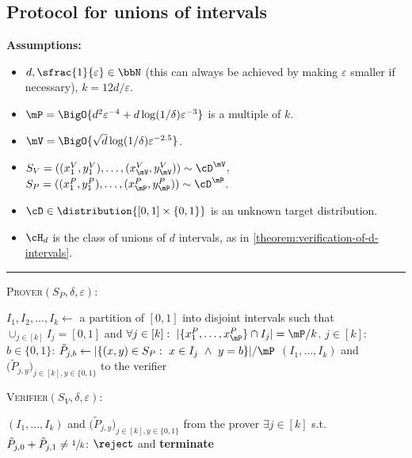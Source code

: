 \documentclass[11pt]{article}
\begin{document}
\begin{minipage}{\textwidth}
\subsection{Protocol for unions of intervals}\label{appendix:union-of-intervals}

\vspace{-0.25cm}
\begin{protocol}[H]
	\begin{ShadedAlgorithmBox}
		{\bfseries Assumptions:} 
		\begin{itemize}	
			\item{$d,\sfrac{1}{\varepsilon} \in \bbN$ (this can always be achieved by making $\varepsilon$ smaller if necessary), $k = 12d/\varepsilon$.}
				\item{$\mP = \BigO{d^2\varepsilon^{-4}	+ d\log(1/\delta)\varepsilon^{-3}}$ is a multiple of $k$.}
				\item{$\mV = \BigO{\sqrt{d}\log(1/\delta)\varepsilon^{-2.5}}$.}
			\item{
				$S_V = ((x_1^V,y_1^V),\dots,(x_{\mV}^V,y_{\mV}^V)) \sim \cD^{\mV}$, $S_P = ((x_1^P,y_1^P),\dots,(x_{\mP}^P,y_{\mP}^P)) \sim \cD^{\mP}$.
			}
			\item{
				$\cD \in \distribution{[0,1]\times \{0,1\}}$ is an unknown target distribution.
			}
			\item{
				$\cH_d$ is the class of unions of $d$ intervals, as in \cref{theorem:verification-of-d-intervals}.
			}
		\end{itemize}

		\noindent\rule{\textwidth}{0.5pt}

		\vsp

		\textsc{Prover}$(S_P,\delta,\varepsilon)$:
		\begin{algorithmic}
			\State $I_1,I_2,\dots,I_k \gets$ a partition of $[0,1]$ into disjoint intervals such that $\cup_{j \in [k]} I_j = [0,1]$
			\State \hfil and $\forall j \in [k]: ~ |\{x_1^P,\dots,x_{\mP}^P\}\cap I_j| = \mP/k$. \hfil
			\vsp
			\For $j \in [k]$:
				\For $b \in \{0,1\}$:
					\State $\tilde{P}_{j,b} \gets |\{(x,y) \in S_P: ~ x \in I_j ~ \land ~ y = b\}| / \mP$
				\EndFor
			\EndFor
			 $\left(I_1,\dots,I_k\right)$ and $\big(\tilde{P}_{j,y}\big)_{j \in [k], y \in \{0,1\}}$ to the verifier
		\end{algorithmic}

		\vsp

		\textsc{Verifier}$(S_V,\delta,\varepsilon)$:	
		\begin{algorithmic}
			 $\left(I_1,\dots,I_k\right)$ and $\big(\tilde{P}_{j,y}\big)_{j \in [k], y \in \{0,1\}}$ from the prover
			\vsp
			\If $\exists j \in [k]$ s.t. $\tilde{P}_{j,0} + \tilde{P}_{j,1} \neq \sfrac{1}{k}$:
				 $\reject$ and {\bfseries terminate} 
			\EndIf


\end{algorithmic}
\end{ShadedAlgorithmBox}
\end{protocol}
\end{minipage}
\end{document}

